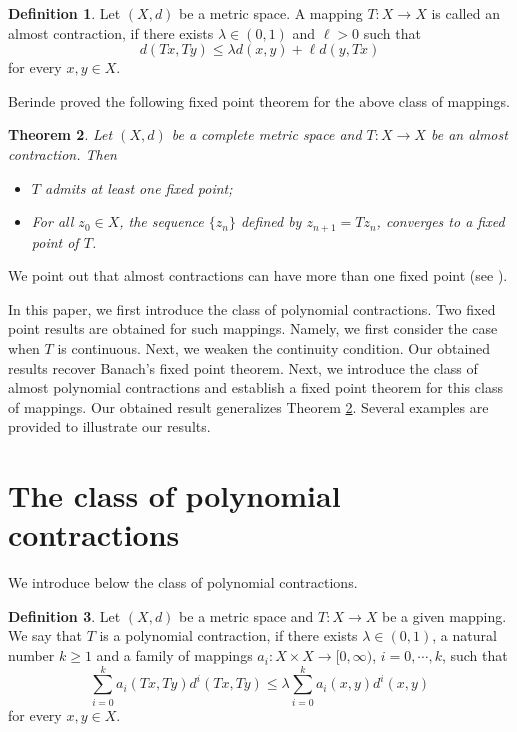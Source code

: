 \documentclass[letterpaper,12pt]{article}
\numberwithin{equation}{section}
\newtheorem{theorem}{Theorem}[section]
\theoremstyle{definition}
\newtheorem{definition}[theorem]{Definition}
\theoremstyle{remark}
\begin{document}
\begin{definition}\label{def1.1}
Let $(X,d)$ be a metric space. A mapping $T: X\to X$ is called an almost contraction, if there exists $\lambda\in (0,1)$ and $\ell>0$ such that 
\begin{equation}\label{contraction-de-Berinde}
d(Tx,Ty)\leq \lambda d(x,y)+\ell d(y,Tx)
\end{equation}
for every $x,y\in X$. 
\end{definition}
 
Berinde \cite{Berinde1} proved the following fixed point theorem for the above class of mappings. 

\begin{theorem}\label{T1.2}
Let $(X,d)$ be a complete metric space and $T: X\to X$ be an almost contraction. Then
\begin{itemize}
\item[{\rm{(i)}}] $T$ admits at least one fixed point;
\item[{\rm{(ii)}}] For all $z_0\in X$, the sequence $\{z_n\}$ defined by $z_{n+1}=Tz_n$, converges to a fixed point of $T$.  	
\end{itemize}
\end{theorem}
We point out that almost contractions can have more than one fixed point (see \cite[Example 1]{Berinde1}).

In this paper, we first introduce the class of polynomial contractions.  Two fixed point results are obtained for such mappings. Namely, we first consider the case when $T$ is continuous. Next, we weaken the continuity condition. Our obtained results recover Banach's fixed point theorem. Next, we introduce the class of almost polynomial contractions and establish a fixed point theorem for this class of mappings. Our obtained result generalizes Theorem \ref{T1.2}.
Several examples are provided to illustrate our results.  

\section{The class of polynomial contractions}\label{sec2}

We introduce below the class of  polynomial contractions.


\begin{definition}\label{def2.1}
Let $(X,d)$ be a metric space and $T: X\to X$	 be a given mapping. We say that $T$ is a polynomial contraction, if there exists $\lambda\in (0,1)$, a natural number $k\geq 1$ and a family of mappings  $a_i: X\times X\to [0,\infty)$, $i=0,\cdots,k$, such that 
\begin{equation}\label{SPC}
\sum_{i=0}^ka_i(Tx,Ty)d^i(Tx,Ty)\leq \lambda \sum_{i=0}^k a_i(x,y)d^i(x,y)	
\end{equation}
for every $x,y\in X$.  
\end{definition}
\end{document}
